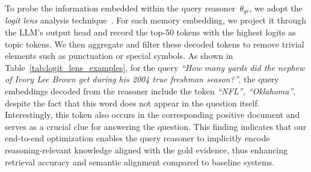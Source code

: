 \documentclass{applemlr}
\numberwithin{equation}{section}
\begin{document}
To  probe the information embedded within the query reasoner~$\theta_{qr}$, 
we adopt the \textit{logit lens} analysis technique~\citep{nostalgebraist2020logitlens}. 
For each memory embedding, we project it through the LLM’s output head and record the top-50 tokens with the highest logits as topic tokens. 
We then aggregate and filter these decoded tokens to remove trivial elements such as punctuation or special symbols. 
As shown in Table~\ref{tab:logit_lens_examples}, 
for the query \textit{``How many yards did the nephew of Ivory Lee Brown get during his 2004 true freshman season?''}, 
the query embeddings decoded from the reasoner include the token \textit{``NFL'', ``Oklahoma''}, despite the fact that this word does not appear in the question itself. Interestingly, this token also occurs in the corresponding positive document and serves as a crucial clue for answering the question. This finding indicates that our end-to-end optimization enables the query reasoner to implicitly encode reasoning-relevant knowledge aligned with the gold evidence, 
thus enhancing retrieval accuracy and semantic alignment compared to baseline systems.
\end{document}
